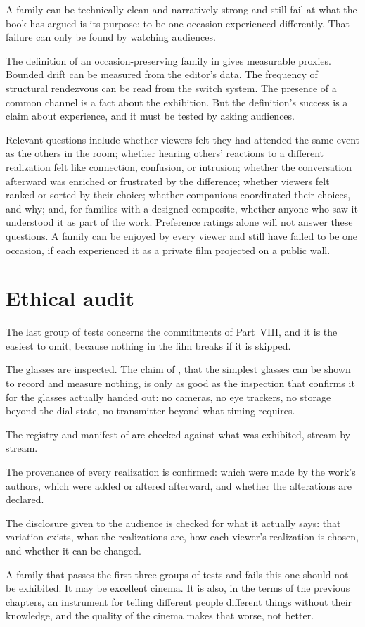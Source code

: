 A family can be technically clean and narratively strong and still fail at what the book has argued is its purpose: to be one occasion experienced differently. That failure can only be found by watching audiences.

The definition of an occasion-preserving family in  gives measurable proxies. Bounded drift can be measured from the editor's data. The frequency of structural rendezvous can be read from the switch system. The presence of a common channel is a fact about the exhibition. But the definition's success is a claim about experience, and it must be tested by asking audiences.

Relevant questions include whether viewers felt they had attended the same event as the others in the room; whether hearing others' reactions to a different realization felt like connection, confusion, or intrusion; whether the conversation afterward was enriched or frustrated by the difference; whether viewers felt ranked or sorted by their choice; whether companions coordinated their choices, and why; and, for families with a designed composite, whether anyone who saw it understood it as part of the work. Preference ratings alone will not answer these questions. A family can be enjoyed by every viewer and still have failed to be one occasion, if each experienced it as a private film projected on a public wall.

\section{Ethical audit}

The last group of tests concerns the commitments of Part~VIII, and it is the easiest to omit, because nothing in the film breaks if it is skipped.

The glasses are inspected. The claim of , that the simplest glasses can be shown to record and measure nothing, is only as good as the inspection that confirms it for the glasses actually handed out: no cameras, no eye trackers, no storage beyond the dial state, no transmitter beyond what timing requires.

The registry and manifest of  are checked against what was exhibited, stream by stream.

The provenance of every realization is confirmed: which were made by the work's authors, which were added or altered afterward, and whether the alterations are declared.

The disclosure given to the audience is checked for what it actually says: that variation exists, what the realizations are, how each viewer's realization is chosen, and whether it can be changed.

A family that passes the first three groups of tests and fails this one should not be exhibited. It may be excellent cinema. It is also, in the terms of the previous chapters, an instrument for telling different people different things without their knowledge, and the quality of the cinema makes that worse, not better.
